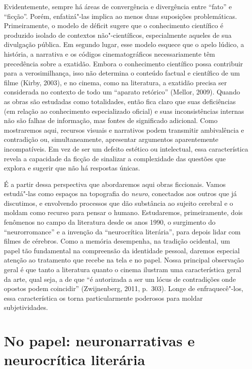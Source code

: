 Evidentemente, sempre há áreas de convergência e divergência entre
``fato'' e ``ficção''. Porém, enfatizá"-las implica ao menos duas
suposições problemáticas. Primeiramente, o modelo de déficit sugere que
o conhecimento científico é produzido isolado de contextos
não"-científicos, especialmente aqueles de sua divulgação pública. Em
segundo lugar, esse modelo esquece que o apelo lúdico, a história,
a narrativa e os códigos cinematográficos necessariamente têm
precedência sobre a exatidão. Embora o conhecimento científico possa
contribuir para a verosimilhança, isso não determina o conteúdo
factual e científico de um filme (Kirby, 2003), e no cinema, como na
literatura, a exatidão precisa ser considerada no contexto de todo um
``aparato retórico'' (Mellor, 2009). Quando as obras são estudadas como
totalidades, então fica claro que suas deficiências (em relação ao
conhecimento especializado oficial) e suas inconsistências internas não
são falhas de informação, mas fontes de significado adicional. Como
mostraremos aqui, recursos visuais e narrativos podem transmitir
ambivalência e contradição ou, simultaneamente, apresentar argumentos
aparentemente incompatíveis. Em vez de ser um defeito estético ou
intelectual, essa característica revela a capacidade da ficção de
sinalizar a complexidade das questões que explora e sugerir que não há
respostas únicas.

É a partir dessa perspectiva que abordaremos aqui obras ficcionais.
Vamos estudá"-las como espaços na topografia do \emph{neuro}, conectados
aos outros que já discutimos, e envolvendo processos que dão substância
ao sujeito cerebral e o moldam como recurso para pensar o humano.
Estudaremos, primeiramente, dois fenômenos no campo da literatura desde
os anos 1990, o surgimento do ``neurorromance'' e a invenção da
``neurocrítica literária'', para depois lidar com filmes de cérebros.
Como a memória desempenha, na tradição ocidental, um papel tão
fundamental na compreensão da identidade pessoal, daremos especial
atenção ao tratamento que recebe na tela e no papel. Nossa principal
observação geral é que tanto a literatura quanto o cinema ilustram uma
característica geral da arte, qual seja, a de que ``é autorizada a ser um
lócus de contradições onde opostos podem coincidir'' (Zwijnenberg, 2011,
p.~303). Longe de enfraquecê"-los, essa característica os torna
particularmente poderosos para moldar subjetividades.

\section{No papel: neuronarrativas e neurocrítica literária}

